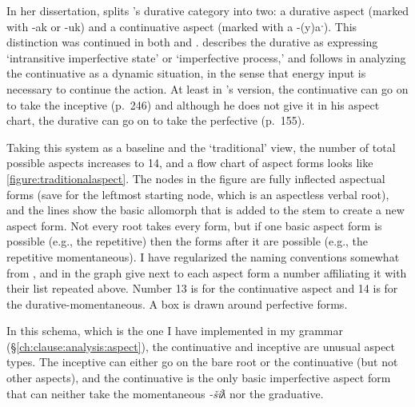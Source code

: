 In her dissertation, \citet[p.~263--269]{rose1981} splits \citeauthor{sapir1939}'s durative category into two: a durative aspect (marked with -ak or -uk) and a continuative aspect (marked with a -(y)aˑ). This distinction was continued in both \citet[p.26--27]{nakayama2001} and \citet[p~.232--237]{davidson2002}. \citeauthor{davidson2002} describes the durative as expressing `intransitive imperfective state' or `imperfective process,' and follows \citeauthor{rose1981} in analyzing the continuative as a dynamic situation, in the sense that energy input is necessary to continue the action. At least in \citeauthor{davidson2002}'s version, the continuative can go on to take the inceptive (p.\ 246) and although he does not give it in his aspect chart, the durative can go on to take the perfective (p.\ 155).

Taking this system as a baseline and the `traditional' view, the number of total possible aspects increases to 14, and a flow chart of aspect forms looks like \cref{figure:traditionalaspect}. The nodes in the figure are fully inflected aspectual forms (save for the leftmost starting node, which is an aspectless verbal root), and the lines show the basic allomorph that is added to the stem to create a new aspect form. Not every root takes every form, but if one basic aspect form is possible (e.g., the repetitive) then the forms after it are possible (e.g., the repetitive momentaneous). I have regularized the naming conventions somewhat from \citeauthor{sapir1939}, and in the graph give next to each aspect form a number affiliating it with their list repeated above. Number 13 is for the continuative aspect and 14 is for the durative-momentaneous. A box is drawn around perfective forms.

In this schema, which is the one I have implemented in my grammar (\S\ref{ch:clause:analysis:aspect}), the continuative and inceptive are unusual aspect types. The inceptive can either go on the bare root or the continuative (but not other aspects), and the continuative is the only basic imperfective aspect form that can neither take the momentaneous \textit{-šiƛ} nor the graduative.

